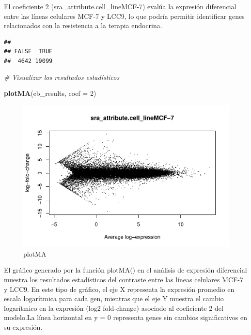 \documentclass[
]{article}
\newenvironment{Shaded}{\begin{snugshade}}{\end{snugshade}}
\newcommand{\AttributeTok}[1]{\textcolor[rgb]{0.13,0.29,0.53}{#1}}
\newcommand{\CommentTok}[1]{\textcolor[rgb]{0.56,0.35,0.01}{\textit{#1}}}
\newcommand{\DecValTok}[1]{\textcolor[rgb]{0.00,0.00,0.81}{#1}}
\newcommand{\FloatTok}[1]{\textcolor[rgb]{0.00,0.00,0.81}{#1}}
\newcommand{\FunctionTok}[1]{\textcolor[rgb]{0.13,0.29,0.53}{\textbf{#1}}}
\newcommand{\NormalTok}[1]{#1}
\newcommand{\SpecialCharTok}[1]{\textcolor[rgb]{0.81,0.36,0.00}{\textbf{#1}}}
\begin{document}
El coeficiente 2 (sra\_attribute.cell\_lineMCF-7) evalúa la expresión
diferencial entre las líneas celulares MCF-7 y LCC9, lo que podría
permitir identificar genes relacionados con la resistencia a la terapia
endocrina.

\begin{Shaded}
\end{Shaded}

\begin{verbatim}
## 
## FALSE  TRUE 
##  4642 19099
\end{verbatim}

\begin{Shaded}
\begin{Highlighting}[]
\CommentTok{\# Visualizar los resultados estadísticos}

\FunctionTok{plotMA}\NormalTok{(eb\_results, }\AttributeTok{coef =} \DecValTok{2}\NormalTok{)}
\end{Highlighting}
\end{Shaded}

\begin{figure}
\centering
\includegraphics{Proyecto_RNAseq_files/figure-latex/unnamed-chunk-15-1.pdf}
\caption{plotMA}
\end{figure}

El gráfico generado por la función plotMA() en el análisis de expresión
diferencial muestra los resultados estadísticos del contraste entre las
líneas celulares MCF-7 y LCC9. En este tipo de gráfico, el eje X
representa la expresión promedio en escala logarítmica para cada gen,
mientras que el eje Y muestra el cambio logarítmico en la expresión
(log2 fold-change) asociado al coeficiente 2 del modelo.La línea
horizontal en y = 0 representa genes sin cambios significativos en su
expresión.
\end{document}
